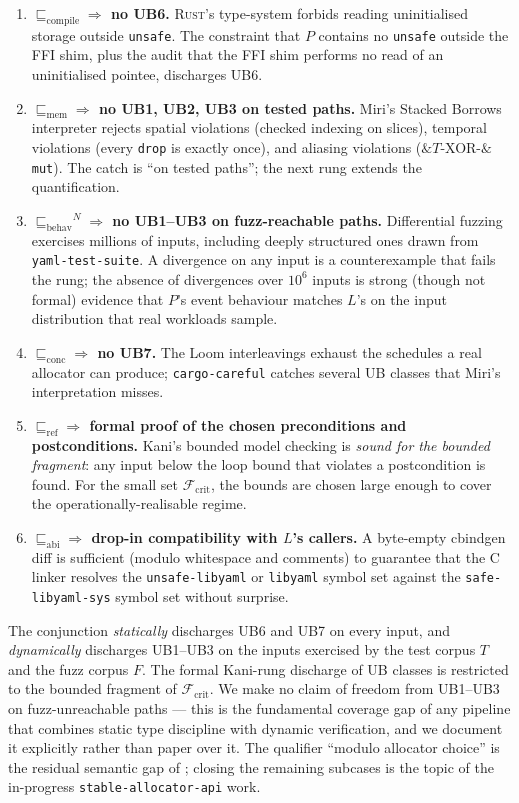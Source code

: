 \documentclass[12pt]{article}
\theoremstyle{definition}
\theoremstyle{remark}
\newcommand{\rust}{\textnormal{\textsc{Rust}}}
\newcommand{\libyaml}{\texttt{libyaml}}
\newcommand{\unsafelibyaml}{\texttt{unsafe-libyaml}}
\newcommand{\Compile}{\ensuremath{\sqsubseteq_{\!\mathrm{compile}}}}
\newcommand{\Memory}{\ensuremath{\sqsubseteq_{\!\mathrm{mem}}}}
\newcommand{\Behav}{\ensuremath{\sqsubseteq_{\!\mathrm{behav}}}}
\newcommand{\Conc}{\ensuremath{\sqsubseteq_{\!\mathrm{conc}}}}
\newcommand{\Refine}{\ensuremath{\sqsubseteq_{\!\mathrm{ref}}}}
\newcommand{\ABI}{\ensuremath{\sqsubseteq_{\!\mathrm{abi}}}}
\begin{document}
\begin{enumerate}
\item \textbf{$\Compile \Rightarrow$ no UB6.} \rust{}'s type-system
forbids reading uninitialised storage outside \texttt{unsafe}. The
constraint that \(P\) contains no \texttt{unsafe} outside the FFI shim,
plus the audit that the FFI shim performs no read of an uninitialised
pointee, discharges UB6.
\item \textbf{$\Memory \Rightarrow$ no UB1, UB2, UB3 on tested
paths.} Miri's Stacked Borrows interpreter rejects spatial violations
(checked indexing on slices), temporal violations (every \texttt{drop}
is exactly once), and aliasing violations (\(\&T\)-XOR-\(\&\)\texttt{mut}).
The catch is ``on tested paths''; the next rung extends the
quantification.
\item \textbf{$\Behav^{N} \Rightarrow$ no UB1--UB3 on
fuzz-reachable paths.} Differential fuzzing exercises millions of
inputs, including deeply structured ones drawn from
\texttt{yaml-test-suite}. A divergence on any input is a counterexample
that fails the rung; the absence of divergences over \(10^6\) inputs
is strong (though not formal) evidence that \(P\)'s event behaviour
matches \(L\)'s on the input distribution that real workloads sample.
\item \textbf{$\Conc \Rightarrow$ no UB7.} The Loom interleavings
exhaust the schedules a real allocator can produce; \texttt{cargo-careful}
catches several UB classes that Miri's interpretation misses.
\item \textbf{$\Refine \Rightarrow$ formal proof of the chosen
preconditions and postconditions.} Kani's bounded model checking is
\emph{sound for the bounded fragment}: any input below the loop bound
that violates a postcondition is found. For the small set
\(\mathcal{F}_{\mathrm{crit}}\), the bounds are chosen large enough to
cover the operationally-realisable regime.
\item \textbf{$\ABI \Rightarrow$ drop-in compatibility with \(L\)'s
callers.} A byte-empty cbindgen diff is sufficient (modulo whitespace
and comments) to guarantee that the C linker resolves the
\unsafelibyaml{} or \libyaml{} symbol set against the
\texttt{safe-libyaml-sys} symbol set without surprise.
\end{enumerate}

The conjunction \emph{statically} discharges UB6 and UB7 on every
input, and \emph{dynamically} discharges UB1--UB3 on the inputs
exercised by the test corpus \(T\) and the fuzz corpus \(F\). The
formal Kani-rung discharge of UB classes is restricted to the bounded
fragment of \(\mathcal{F}_{\mathrm{crit}}\). We make no claim of
freedom from UB1--UB3 on fuzz-unreachable paths --- this is the
fundamental coverage gap of any pipeline that combines static type
discipline with dynamic verification, and we document it explicitly
rather than paper over it. The qualifier ``modulo allocator choice''
is the residual semantic gap of ; closing the
remaining subcases is the topic of the in-progress
\texttt{stable-allocator-api} work.
\end{document}
